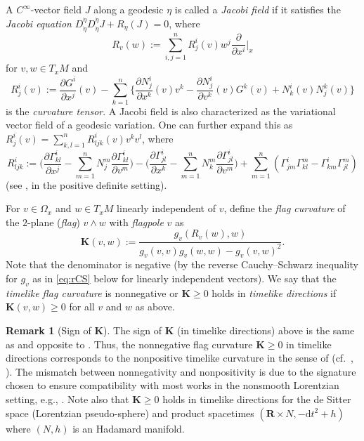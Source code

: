 \documentclass[a4paper,11pt]{article}
\numberwithin{equation}{section}
\theoremstyle{definition}
\newtheorem{remark}[definition]{Remark}
\theoremstyle{plain}
\newcommand{\R}{\mathbf R}
\newcommand{\del}{\partial}
\newcommand{\bK}{\mathbf{K}}
\newcommand{\dd}{\mathrm{d}}
\begin{document}
A $C^{\infty}$-vector field $J$ along a geodesic $\eta$ is called a \emph{Jacobi field}
if it satisfies the \emph{Jacobi equation} $D^{\dot{\eta}}_{\dot{\eta}} D^{\dot{\eta}}_{\dot{\eta}} J +R_{\dot{\eta}}(J) =0$,
where
\[ R_v(w):=\sum_{i,j=1}^n R^i_j(v) w^j \frac{\del}{\del x^i} \bigg|_x \]
for $v,w \in T_xM$ and
\[ R^i_j(v) :=\frac{\del G^i}{\del x^j}(v)
 -\sum_{k=1}^n \biggl\{ \frac{\del N^i_j}{\del x^k}(v) v^k
 -\frac{\del N^i_j}{\del v^k}(v) G^k(v) +N^i_k(v) N^k_j(v) \biggr\} \]
is the \emph{curvature tensor}.
A Jacobi field is also characterized as the variational vector field of a geodesic variation.
One can further expand this as $R^i_j(v)=\sum_{k,l=1}^n R^i_{ljk}(v)v^k v^l$, where
\[ R^i_{ljk}
 :=\Biggl( \frac{\del\Gamma^i_{kl}}{\del x^j} -\sum_{m=1}^n N^m_j \frac{\del\Gamma^i_{kl}}{\del v^m} \Biggr)
 -\Biggl( \frac{\del\Gamma^i_{jl}}{\del x^k} -\sum_{m=1}^n N^m_k \frac{\del\Gamma^i_{jl}}{\del v^m} \Biggr)
 +\sum_{m=1}^n(\Gamma^i_{jm} \Gamma^m_{kl} -\Gamma^i_{km} \Gamma^m_{jl}) \]
(see \cite[(3.3.2)]{BCS}, \cite[(5.10)]{Obook} in the positive definite setting).

For $v \in \Omega_x$ and $w \in T_xM$ linearly independent of $v$,
define the \emph{flag curvature} of the $2$-plane (\emph{flag}) $v \wedge w$ with \emph{flagpole} $v$ as 
\[ \bK(v,w) :=\frac{g_v(R_v(w),w)}{g_v(v,v) g_v(w,w) -g_v(v,w)^2}. \]
Note that the denominator is negative (by the reverse Cauchy--Schwarz inequality for $g_v$ as in \eqref{eq:rCS} below for linearly independent vectors).
We say that the \emph{timelike flag curvature} is nonnegative or $\bK \ge 0$ holds in \emph{timelike directions} if $\bK(v,w) \ge 0$ for all $v$ and $w$ as above.

\begin{remark}[Sign of $\bK$]\label{rm:sign}
The sign of $\bK$ (in timelike directions) above is the same as \cite{BEE,BKOR} and opposite to  \cite{LMO1}.
Thus, the nonnegative flag curvature $\bK \ge 0$ in timelike directions corresponds to
the nonpositive timelike curvature in the sense of \cite{AB,KS,BKR}
(cf.\ \cite[Example~4.9]{KS}, \cite[Remark~2.2]{BKOR}).
The mismatch between nonnegativity and nonpositivity is due to the signature chosen to ensure compatibility with most works in the nonsmooth Lorentzian setting, e.g., \cite{KS,BKR,BKOR}. 
Note also that $\bK \ge 0$ holds in timelike directions for the de Sitter space (Lorentzian pseudo-sphere)
and product spacetimes $(\R \times N, -\dd t^2 +h)$ where $(N,h)$ is an Hadamard manifold. 

\end{remark}
\end{document}
